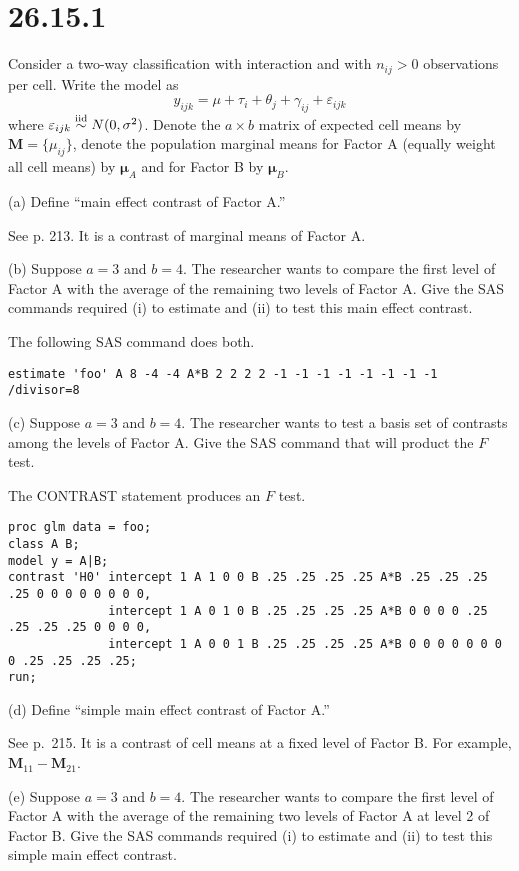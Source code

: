 \section*{26.15.1}
Consider a two-way classification with interaction and with
$n_{ij}>0$ observations per cell. Write the model as
\[
y_{ijk}=\mu+\tau_i+\theta_j+\gamma_{ij}+\varepsilon_{ijk}
\]
where $\varepsilon_{ijk}\stackrel{\rm iid}{\sim}
N(0,\sigma^2)$. Denote the $a\times b$ matrix of expected cell means
by $\mathbf M=\{\mu_{ij}\}$, denote the population marginal means
for Factor A (equally weight all cell means) by $\bm\mu_A$ and for
Factor B by $\bm\mu_B$.

\bigskip
\noindent
(a) Define ``main effect contrast of Factor A.''

\bigskip
\noindent
See p. 213. It is a contrast of marginal means of Factor A.

\bigskip
\noindent
(b) Suppose $a=3$ and $b=4$. The researcher wants to compare the
first level of Factor A with the average of the remaining two levels
of Factor A. Give the SAS commands required (i) to estimate and
(ii) to test this main effect contrast.

\bigskip
\noindent
The following SAS command does both.
\begin{verbatim}
estimate 'foo' A 8 -4 -4 A*B 2 2 2 2 -1 -1 -1 -1 -1 -1 -1 -1 /divisor=8
\end{verbatim}

\bigskip
\noindent
(c) Suppose $a=3$ and $b=4$. The researcher wants to test a basis
set of contrasts among the levels of Factor A.
Give the SAS command that will product the $F$ test.

\bigskip
\noindent
The CONTRAST statement produces an $F$ test.
\begin{verbatim}
proc glm data = foo;
class A B;
model y = A|B;
contrast 'H0' intercept 1 A 1 0 0 B .25 .25 .25 .25 A*B .25 .25 .25 .25 0 0 0 0 0 0 0 0,
              intercept 1 A 0 1 0 B .25 .25 .25 .25 A*B 0 0 0 0 .25 .25 .25 .25 0 0 0 0,
              intercept 1 A 0 0 1 B .25 .25 .25 .25 A*B 0 0 0 0 0 0 0 0 .25 .25 .25 .25;
run;
\end{verbatim}

\bigskip
\noindent
(d) Define ``simple main effect contrast of Factor A.''

\bigskip
\noindent
See p.\ 215. It is a contrast of cell means at a
fixed level of Factor B. For example, $\mathbf M_{11}-\mathbf M_{21}$.

\bigskip
\noindent
(e) Suppose $a=3$ and $b=4$. The researcher wants to compare the first
level of Factor A with the average of the remaining two levels of
Factor A at level 2 of Factor B. Give the SAS commands required
(i) to estimate and (ii) to test this simple main effect contrast.

